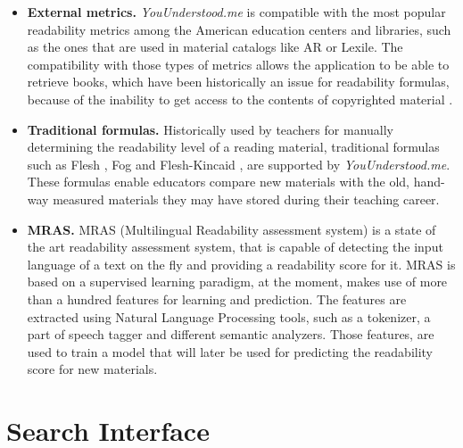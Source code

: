 \documentclass{sig-alternate-05-2015}
\begin{document}
\begin{itemize}
\item \textbf{External metrics.} \textit{YouUnderstood.me} is compatible with the most popular readability metrics among the American education centers and libraries, such as the ones that are used in material catalogs like AR or Lexile. The compatibility with those types of metrics allows the application to be able to retrieve books, which have been historically an issue for readability formulas, because of the inability to get access to the contents of copyrighted material \cite{denning2015readability}.
\item \textbf{Traditional formulas.} Historically used by teachers for manually determining the readability level of a reading material, traditional formulas such as Flesh \cite{flesch1948new}, Fog\cite{gunning1952technique} and Flesh-Kincaid \cite{flesch1948new}, are supported by \textit{YouUnderstood.me}. These formulas enable educators compare new materials with the old, hand-way measured materials they may have stored during their teaching career.
\item \textbf{MRAS.} MRAS\cite{imadrazo2016readability} (Multilingual Readability assessment system) is a state of the art readability assessment system, that is capable of detecting the input language of a text on the fly and providing a readability score for it. MRAS is based on a supervised learning paradigm, at the moment, makes use of more than a hundred features for learning and prediction. The features are extracted using Natural Language Processing tools, such as a tokenizer, a part of speech tagger and different semantic analyzers. Those features, are used to train a model that will later be used for predicting the readability score for new materials.


\end{itemize}











%




\section{Search Interface}
\end{document}
